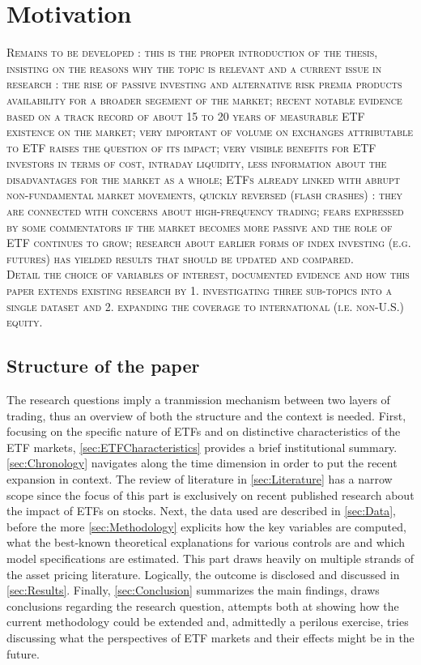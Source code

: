 \section{Motivation}
\label{sec:Motivation}
\begin{center}
  \textsc{Remains to be developed : this is the proper introduction of the thesis, insisting on the reasons why the topic is relevant and a current issue in research : the rise of passive investing and alternative risk premia products availability for a broader segement of the market; recent notable evidence based on a track record of about 15 to 20 years of measurable ETF existence on the market; very important of volume on exchanges attributable to ETF raises the question of its impact; very visible benefits for ETF investors in terms of cost, intraday liquidity, less information about the disadvantages for the market as a whole; ETFs already linked with abrupt non-fundamental market movements, quickly reversed (flash crashes) : they are connected with concerns about high-frequency trading; fears expressed by some commentators if the market becomes more passive and the role of ETF continues to grow; research about earlier forms of index investing (e.g. futures) has yielded results that should be updated and compared.\\Detail the choice of variables of interest, documented evidence and how this paper extends existing research by 1. investigating three sub-topics into a single dataset and 2. expanding the coverage to international (i.e. non-U.S.) equity.}
  \end{center}

\subsection{Structure of the paper}
The research questions imply a tranmission mechanism between two layers of trading, thus an overview of both the structure and the context is needed. First, focusing on the specific nature of ETFs and on distinctive characteristics of the ETF markets, \autoref{sec:ETFCharacteristics} provides a brief institutional summary. \autoref{sec:Chronology} navigates along the time dimension in order to put the recent expansion in context. The review of literature in \autoref{sec:Literature} has a narrow scope since the focus of this part is exclusively on recent published research about the impact of ETFs on stocks. Next, the data used are described in \autoref{sec:Data}, before the more \autoref{sec:Methodology} explicits how the key variables are computed, what the best-known theoretical explanations for various controls are and which model specifications are estimated. This part draws heavily on multiple strands of the asset pricing literature. Logically, the outcome is disclosed and discussed in \autoref{sec:Results}. Finally, \autoref{sec:Conclusion} summarizes the main findings, draws conclusions regarding the research question, attempts both at showing how the current methodology could be extended and, admittedly a perilous exercise, tries discussing what the perspectives of ETF markets and their effects might be in the future. 
